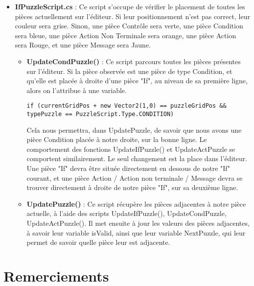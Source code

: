 \documentclass{article}
\begin{document}
\begin{itemize}
\item\textbf{IfPuzzleScript.cs} : Ce script s'occupe de vérifier le placement de toutes les pièces actuellement sur l'éditeur. Si leur positionnement n'est pas correct, leur couleur sera grise. Sinon, une pièce Contrôle sera verte, une pièce Condition sera bleue, une pièce Action Non Terminale sera orange, une pièce Action sera Rouge, et une pièce Message sera Jaune.
\begin{itemize}
\item\textbf{UpdateCondPuzzle()} : Ce script parcours toutes les pièces présentes sur l'éditeur. Si la pièce observée est une pièce de type Condition, et qu'elle est placée à droite d'une pièce "If", au niveau de sa première ligne, alors on l'attribue à une variable.

\begin{lstlisting}[frame=single]
if (currentGridPos + new Vector2(1,0) == puzzleGridPos && typePuzzle == PuzzleScript.Type.CONDITION)
\end{lstlisting}

\smallbreak
Cela nous permettra, dans UpdatePuzzle, de savoir que nous avons une pièce Condition placée à notre droite, sur la bonne ligne.
Le comportement des fonctions UpdateIfPuzzle() et UpdateActPuzzle se comportent similairement. Le seul changement est la place dans l'éditeur. Une pièce "If" devra être située directement en dessous de notre "If" courant, et une pièce Action / Action non terminale / Message devra se trouver directement à droite de notre pièce "If", sur sa deuxième ligne.
\item\textbf{UpdatePuzzle()} : Ce script récupère les pièces adjacentes à notre pièce actuelle, à l'aide des scripts UpdateIfPuzzle(), UpdateCondPuzzle, UpdateActPuzzle(). Il met ensuite à jour les valeurs des pièces adjacentes, à savoir leur variable isValid, ainsi que leur variable NextPuzzle, qui leur permet de savoir quelle pièce leur est adjacente.

\end{itemize}
\end{itemize}




\section*{Remerciements}
\end{document}
